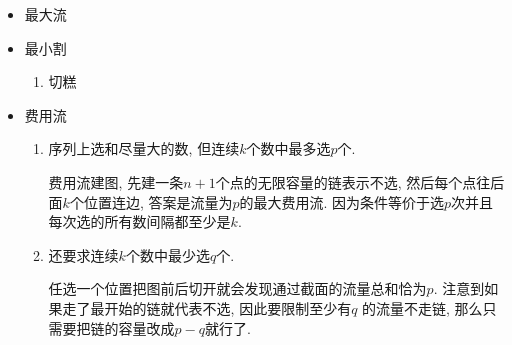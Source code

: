 \begin{itemize}

\item 最大流



\item 最小割

\begin{enumerate}

\item 切糕

\end{enumerate}

\item 费用流

\begin{enumerate}

\item 序列上选和尽量大的数, 但连续$k$个数中最多选$p$个.

费用流建图, 先建一条$n+1$个点的无限容量的链表示不选, 然后每个点往后面$k$个位置连边, 答案是流量为$p$的最大费用流. 因为条件等价于选$p$次并且每次选的所有数间隔都至少是$k$.

\item 还要求连续$k$个数中最少选$q$个.

任选一个位置把图前后切开就会发现通过截面的流量总和恰为$p$. 注意到如果走了最开始的链就代表不选, 因此要限制至少有$q$
的流量不走链, 那么只需要把链的容量改成$p - q$就行了.

\end{enumerate}

\end{itemize}